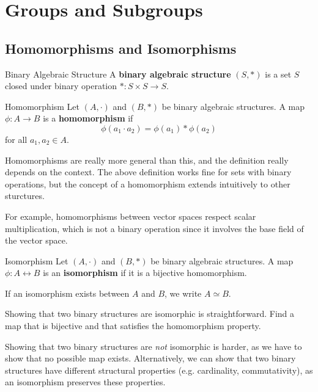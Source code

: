 \documentclass[10pt]{report}
\begin{document}
\tableofcontents


\chapter{Groups and Subgroups}


\section{Homomorphisms and Isomorphisms}

\begin{defn}{Binary Algebraic Structure}{}
        A \textbf{binary algebraic structure} $(S, *)$ is a set $S$ closed under binary operation $* : S \times S \to S$.
\end{defn}

\begin{defn}{Homomorphism}{}
	Let $(A, \cdot)$ and $(B,*)$ be binary algebraic structures. A map $\phi:A \to B$ is a \textbf{homomorphism} if
	\[
		\phi(a_1 \cdot a_2) = \phi(a_1) * \phi(a_2)
	\] for all $a_1, a_2 \in A$.
\end{defn}

Homomorphisms are really more general than this, and the definition really depends on the context. The above definition works fine for sets with binary operations, but the concept of a homomorphism extends intuitively to other sturctures.

For example, homomorphisms between vector spaces respect scalar multiplication, which is not a binary operation since it involves the base field of the vector space.

\begin{defn}{Isomorphism}{}
Let $(A, \cdot)$ and $(B,*)$ be binary algebraic structures. A map $\phi:A \leftrightarrow B$ is an \textbf{isomorphism} if it is a bijective homomorphism.

If an isomorphism exists between $A$ and $B$, we write $A \simeq B$.
\end{defn}

Showing that two binary structures are isomorphic is straightforward. Find a map that is bijective and that satisfies the homomorphism property.

Showing that two binary structures are \textit{not} isomorphic is harder, as we have to show that no possible map exists. Alternatively, we can show that two binary structures have different structural properties (e.g. cardinality, commutativity), as an isomorphism preserves these properties.
\end{document}
